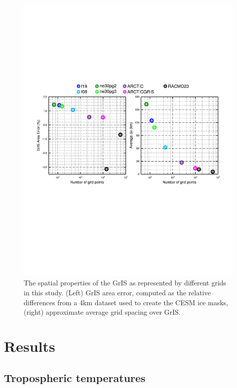 \documentclass[draft]{agujournal2019}
\begin{document}
\begin{figure}[t]
\begin{center}
         \includegraphics[width=130mm]{figs/temp_grisres.pdf}
\end{center}
\caption{The spatial properties of the GrIS as represented by different grids in this study. (Left) GrIS area error, computed as the relative differences from a 4km dataset used to create the CESM ice masks, (right) approximate average grid spacing over GrIS.}
\label{fig:grisdx}
\end{figure}

\section{Results}\label{sec:results}

\subsection{Tropospheric temperatures}
\end{document}
